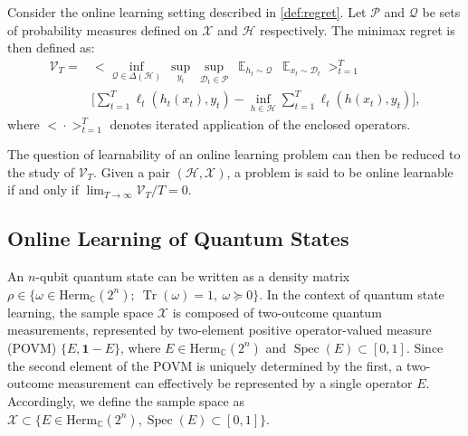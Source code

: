 \begin{definition}
    Consider the online learning setting described in \cref{def:regret}. Let $\mathcal{P}$ and $\mathcal{Q}$ be sets of probability measures defined on $\mathcal{X}$ and $\mathcal{H}$ respectively. The minimax regret is then defined as:
\begin{equation*}
    \label{eq:minmax_reg}
    \begin{aligned}
     \mathcal{V}_T = &\Big< \inf_{\mathcal{Q} \in \Delta(\mathcal{H})} \ \sup_{y_t} \  \sup_{\mathcal{D}_t \in \mathcal{P}} \  \mathop{\mathbb{E}}_{h_t \sim \mathcal{Q}} \  \mathop{\mathbb{E}}_{x_t \sim \mathcal{D}_t} \Big>_{t=1}^T \\&\Big[ \sum_{t=1}^T \ell_t (h_t (x_t), y_t) - \inf_{h \in \mathcal{H}} \sum_{t=1}^T \ell_t(h(x_t), y_t) \Big],
     \end{aligned}
\end{equation*}
    where $\big< \cdot \big>_{t=1}^T$ denotes iterated application of the enclosed operators. 
\end{definition}
The question of learnability of an online learning problem can then be reduced to the study of $\mathcal{V}_T$. Given a pair $(\mathcal{H}, \mathcal{X})$, a problem is said to be online learnable if and only if $\lim_{T \rightarrow \infty} \mathcal{V}_T/T = 0$.

\subsection{Online Learning of Quantum States}

An $n$-qubit quantum state can be written as a density matrix $\rho \in \{\omega \in\mathrm{Herm}_{\mathbb{C}} (2^n); \ \operatorname{Tr}(\omega) = 1, \ \omega \succeq 0\}$. In the context of quantum state learning, the sample space $\mathcal{X}$ is composed of two-outcome quantum measurements, represented by two-element positive operator-valued measure (POVM) $\{E, \mathbf{1} - E\}$, where $E\in\mathrm{Herm}_{\mathbb{C}}(2^n)$ and $\operatorname{Spec}(E) \subset[0, 1]$. Since the second element of the POVM is uniquely determined by the first, a two-outcome measurement can effectively be represented by a single operator $E$. Accordingly, we define the sample space as $\mathcal{X} \subset \{E\in\mathrm{Herm}_{\mathbb{C}}(2^n), \operatorname{Spec}(E) \subset[0, 1]\}$.

